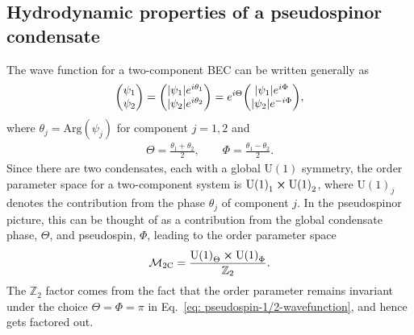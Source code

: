 \subsection{Hydrodynamic properties of a pseudospinor condensate}
The wave function for a two-component BEC can be written generally as
\begin{align}
    \mqty(\psi_1 \\ \psi_2) =
    \mqty(|\psi_1|e^{i\theta_1} \\ |\psi_2|e^{i\theta_2}) =
    e^{i\Theta}\mqty(|\psi_1|e^{i\Phi} \\ |\psi_2|e^{-i\Phi}),
    \label{eq: pseudospin-1/2-wavefunction}
\end{align}
where \( \theta_j=\mathrm{Arg}(\psi_j) \) for component \( j=1,2 \) and
\begin{align}\label{eq: Theta-Phi}
    \Theta = \frac{\theta_1 + \theta_2}{2}, \qquad
    \Phi = \frac{\theta_1 - \theta_2}{2}.
\end{align}
Since there are two condensates, each with a global \(\text{U}(1)\) symmetry,
the order parameter space for a two-component system is \({\text{U}(1)}_1 \cross
{\text{U}(1)}_2\), where \({\text{U}(1)}_j\) denotes the contribution from
the phase \(\theta_j\) of component \(j\).
In the pseudospinor picture, this can be thought of as a contribution from the
global condensate phase, \(\Theta \), and pseudospin, \(\Phi \), leading to the
order parameter space~\cite{Eto2011}
\begin{align}
    \mathcal{M}_\text{2C} = \frac{{\text{U}(1)}_\Theta \cross
    {\text{U}(1)}_{\Phi}}{\mathbb{Z}_2}.
\end{align}
The \(\mathbb{Z}_2\) factor comes from the fact that the order parameter remains
invariant under the choice \(\Theta=\Phi=\pi \) in
Eq.~\eqref{eq: pseudospin-1/2-wavefunction}, and hence gets factored out.

